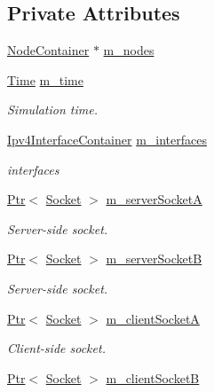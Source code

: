 \subsection*{Private Attributes}
\begin{DoxyCompactItemize}
\item 
\hyperlink{classns3_1_1NodeContainer}{Node\+Container} $\ast$ \hyperlink{classHwmpDoRfRegressionTest_a903b552fef92a7ca46584cdf2282f82e}{m\+\_\+nodes}
\item 
\hyperlink{classns3_1_1Time}{Time} \hyperlink{classHwmpDoRfRegressionTest_a16ff8bb3b1ea62bfd36863be14d95c31}{m\+\_\+time}
\begin{DoxyCompactList}\small\item\em Simulation time. \end{DoxyCompactList}\item 
\hyperlink{classns3_1_1Ipv4InterfaceContainer}{Ipv4\+Interface\+Container} \hyperlink{classHwmpDoRfRegressionTest_aca20600757c3e4278038ad8c2d7e370e}{m\+\_\+interfaces}
\begin{DoxyCompactList}\small\item\em interfaces \end{DoxyCompactList}\item 
\hyperlink{classns3_1_1Ptr}{Ptr}$<$ \hyperlink{classns3_1_1Socket}{Socket} $>$ \hyperlink{classHwmpDoRfRegressionTest_a506012f31d13e62153b5de6b4160b894}{m\+\_\+server\+SocketA}
\begin{DoxyCompactList}\small\item\em Server-\/side socket. \end{DoxyCompactList}\item 
\hyperlink{classns3_1_1Ptr}{Ptr}$<$ \hyperlink{classns3_1_1Socket}{Socket} $>$ \hyperlink{classHwmpDoRfRegressionTest_a916daf5af41b03a35234ed314b0708b0}{m\+\_\+server\+SocketB}
\begin{DoxyCompactList}\small\item\em Server-\/side socket. \end{DoxyCompactList}\item 
\hyperlink{classns3_1_1Ptr}{Ptr}$<$ \hyperlink{classns3_1_1Socket}{Socket} $>$ \hyperlink{classHwmpDoRfRegressionTest_a92b62d465821ab3585dbc131a880d2d0}{m\+\_\+client\+SocketA}
\begin{DoxyCompactList}\small\item\em Client-\/side socket. \end{DoxyCompactList}\item 
\hyperlink{classns3_1_1Ptr}{Ptr}$<$ \hyperlink{classns3_1_1Socket}{Socket} $>$ \hyperlink{classHwmpDoRfRegressionTest_ae0bc2780d26fb6396f996966f1b6e57e}{m\+\_\+client\+SocketB}

\end{DoxyCompactItemize}
